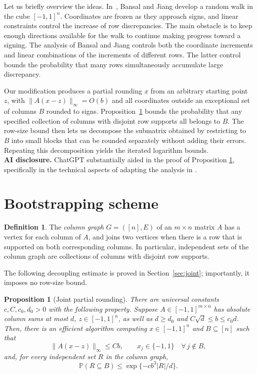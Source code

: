 \documentclass[reqno]{amsart}
\newtheorem{proposition}[theorem]{Proposition}
\theoremstyle{definition}
\newtheorem{definition}[theorem]{Definition}
\newcommand{\Prob}{\mathbb P}
\newcommand{\norm}[1]{\lVert#1\rVert}
\begin{document}
Let us briefly overview the ideas. In~\cite{BJ}, Bansal and Jiang develop a random walk in the cube $[-1,1]^n$. Coordinates are frozen as they approach signs, and linear constraints control the increase of row discrepancies. The main obstacle is to keep enough directions available for the walk to continue making progress toward a signing. The analysis of Bansal and Jiang controls both the coordinate increments and linear combinations of the increments of different rows. The latter control bounds the probability that many rows simultaneously accumulate large discrepancy.

Our modification produces a partial rounding $x$ from an arbitrary starting point $z$, with $\|A(x-z)\|_\infty=O(b)$ and all coordinates outside an exceptional set of columns $B$ rounded to signs. Proposition~\ref{prop:partial} bounds the probability that any specified collection of columns with disjoint row supports all belongs to $B$. The row-size bound then lets us decompose the submatrix obtained by restricting to $B$ into small blocks that can be rounded separately without adding their errors. Repeating this decomposition yields the iterated logarithm bounds. \\

\textbf{AI disclosure.} ChatGPT substantially aided in the proof of Proposition \ref{prop:partial}, specifically in the technical aspects of adapting the analysis in \cite{BJ}.


\section{Bootstrapping scheme}

\begin{definition}\label{def:columngraph}
The \emph{column graph} $G = ([n],E)$ of an $m\times n$ matrix $A$ has a vertex for each column of $A$, and joins two vertices when there is a row that is supported on both corresponding columns. In particular, independent sets of the column graph are collections of columns with disjoint row supports.
\end{definition}


The following decoupling estimate is proved in Section~\ref{sec:joint}; importantly, it imposes no row-size bound.

\begin{proposition}[Joint partial rounding]\label{prop:partial}
There are universal constants $c,C,c_0,d_0>0$ with the following property. Suppose $A\in[-1,1]^{m\times n}$ has absolute column sums at most $d$, $z\in[-1,1]^n$, as well as $d\ge d_0$ and $C\sqrt d\le b\le c_0d$. Then, there is an efficient algorithm computing $x\in[-1,1]^n$ and $B\subseteq[n]$ such that
\begin{equation}\label{eq:partial-error} \norm{A(x-z)}_\infty\le Cb, \qquad x_j\in\{-1,1\} \quad \forall\, j\notin B, \end{equation}
and, for every independent set $R$ in the column graph,
\begin{equation}\label{eq:joint-tail} \Prob(R\subseteq B)\le\exp\{-cb^3|R|/d\}. \end{equation}
\end{proposition}
\end{document}
